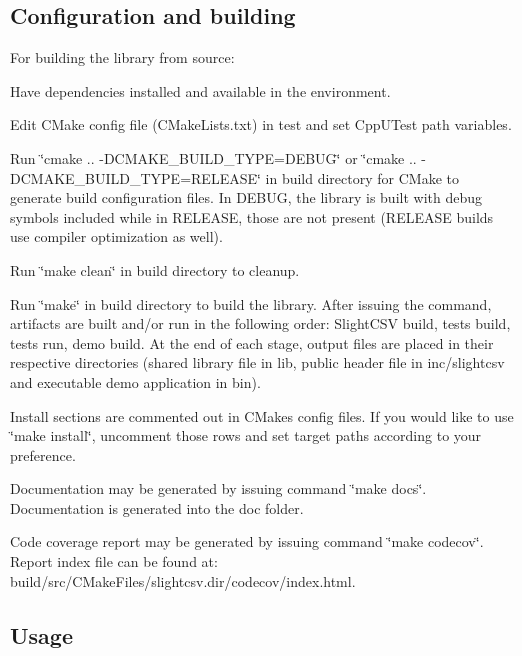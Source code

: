 \subsection*{Configuration and building}

For building the library from source\+:


\begin{DoxyItemize}
\item Have dependencies installed and available in the environment.
\item Edit C\+Make config file (C\+Make\+Lists.\+txt) in test and set Cpp\+U\+Test path variables.
\item Run \char`\"{}cmake .. -\/\+D\+C\+M\+A\+K\+E\+\_\+\+B\+U\+I\+L\+D\+\_\+\+T\+Y\+P\+E=\+D\+E\+B\+U\+G\char`\"{} or \char`\"{}cmake .. -\/\+D\+C\+M\+A\+K\+E\+\_\+\+B\+U\+I\+L\+D\+\_\+\+T\+Y\+P\+E=\+R\+E\+L\+E\+A\+S\+E\char`\"{} in build directory for C\+Make to generate build configuration files. In D\+E\+B\+UG, the library is built with debug symbols included while in R\+E\+L\+E\+A\+SE, those are not present (R\+E\+L\+E\+A\+SE builds use compiler optimization as well).
\item Run \char`\"{}make clean\char`\"{} in build directory to cleanup.
\item Run \char`\"{}make\char`\"{} in build directory to build the library. After issuing the command, artifacts are built and/or run in the following order\+: Slight\+C\+SV build, tests build, tests run, demo build. At the end of each stage, output files are placed in their respective directories (shared library file in lib, public header file in inc/slightcsv and executable demo application in bin).
\item Install sections are commented out in C\+Make\textquotesingle{}s config files. If you would like to use \char`\"{}make install\char`\"{}, uncomment those rows and set target paths according to your preference.
\item Documentation may be generated by issuing command \char`\"{}make docs\char`\"{}. Documentation is generated into the doc folder.
\item Code coverage report may be generated by issuing command \char`\"{}make codecov\char`\"{}. Report index file can be found at\+: build/src/\+C\+Make\+Files/slightcsv.\+dir/codecov/index.html.
\end{DoxyItemize}

\subsection*{Usage}

